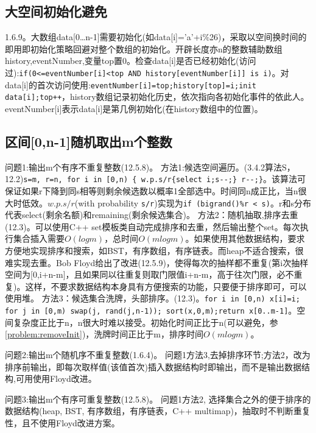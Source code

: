\subsection{大空间初始化避免}
\cite{pp}1.6.9。大数组data[0\dots n-1]需要初始化(如data[i]='a'+i\%26)，采取以空间换时间的即用即初始化策略回避对整个数组的初始化。开辟长度亦n的整数辅助数组history,eventNumber,变量top置0。检查data[i]是否已经初始化(访问过):\verb|if(0<=eventNumber[i]<top AND history[eventNumber[i]] is i)|。对data[i]的首次访问使用:\verb|eventNumber[i]=top;history[top]=i;init data[i];top++|，history数组记录初始化历史，依次指向各初始化事件的依此人。eventNumber[i]表示data[i]是第几例初始化(在history数组中的位置)。\label{problem:removeInit}

\subsection{区间[0,n-1]随机取出m个整数}

问题1:输出m个有序不重复整数(\cite{pp}12.5.8)。
方法1:候选空间遍历。(\cite{acp}3.4.2算法S，\cite{pp}12.2)\verb|s=m, r=n, for i in [0,n) { w.p.s/r{select i;s--;} r--;}|。该算法可保证如果r下降到同s相等则剩余候选数以概率1全部选中。时间同n成正比，当n很大时低效。$w.p.s/r$(with probability \verb|s/r|)实现为\verb|if (bigrand()%r < s)|。r和s分布代表select(剩余名额)和remaining(剩余候选集合)。
方法2：随机抽取,排序去重(\cite{pp}12.3)。可以使用C++ set模板类自动完成排序和去重，然后输出整个set。每次执行集合插入需要$O(logm)$，总时间$O(mlog m)$。如果使用其他数据结构\cite{self}，要求方便地实现排序和搜索，如BST，有序数组，有序链表。而heap不适合搜索，很难实现去重。Bob Floyd给出了改进(\cite{pp}12.5.9)，使得每次的抽样都不重复(第i次抽样空间为[0,i+n-m]，且如果同以往重复则取门限值i+n-m，高于往次门限，必不重复)。这样，不要求数据结构本身具有方便搜索的功能，只要便于排序即可，可以使用堆。
方法3：候选集合洗牌，头部排序。(\cite{pp}12.3)。\verb|for i in [0,n) x[i]=i; for j in [0,m) swap(j, rand(j,n-1)); sort(x,0,m);return x[0..m-1]|。空间复杂度正比于n，n很大时难以接受。初始化时间正比于n(可以避免，参\ref{problem:removeInit})，洗牌时间正比于m，排序时间$O(mlogm)$。

问题2:输出m个随机序不重复整数(\cite{pp}1.6.4)。
问题1方法3,去掉排序环节;方法2，改为排序前输出，即每次取样值(该值首次)插入数据结构时即输出，而不是输出数据结构,可用使用Floyd改进。

问题3:输出m个有序可重复整数(\cite{pp}12.5.8)。
问题1方法2, 选择集合之外的便于排序的数据结构(heap, BST, 有序数组，有序链表，C++ multimap)，抽取时不判断重复性，且不使用Floyd改进方案。

